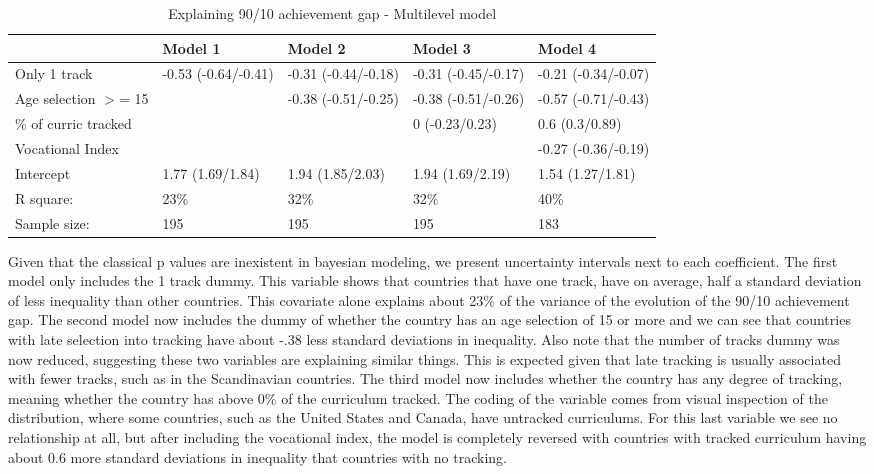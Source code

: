 \documentclass[11pt, a4paper]{article}\usepackage[]{graphicx}\usepackage[]{color}
\begin{document}
\begin{table}[ht]
\centering
\begin{tabular}{lllll}
  \hline
  & Model 1 & Model 2 & Model 3 & Model 4 \\ 
  \hline
Only 1 track & -0.53 (-0.64/-0.41) & -0.31 (-0.44/-0.18) & -0.31 (-0.45/-0.17) & -0.21 (-0.34/-0.07) \\ 
  Age selection $>$= 15 &  & -0.38 (-0.51/-0.25) & -0.38 (-0.51/-0.26) & -0.57 (-0.71/-0.43) \\ 
  \% of curric tracked &  &  & 0 (-0.23/0.23) & 0.6 (0.3/0.89) \\ 
  Vocational Index &  &  &  & -0.27 (-0.36/-0.19) \\ 
  Intercept & 1.77 (1.69/1.84) & 1.94 (1.85/2.03) & 1.94 (1.69/2.19) & 1.54 (1.27/1.81) \\ 
   \hline R square: & 23\% & 32\% & 32\% & 40\% \\ Sample size: & 195 & 195 & 195 & 183 \\ \hline \hline
\end{tabular}
\caption{Explaining 90/10 achievement gap - Multilevel model} 
\end{table}


Given that the classical p values are inexistent in bayesian modeling, we present uncertainty intervals next to each coefficient. The first model only includes the 1 track dummy. This variable shows that countries that have one track, have on average, half a standard deviation of less inequality than other countries. This covariate alone explains about 23\% of the variance of the evolution of the 90/10 achievement gap. The second model now includes the dummy of whether the country has an age selection of 15 or more and we can see that countries with late selection into tracking have about -.38 less standard deviations in inequality. Also note that the number of tracks dummy was now reduced, suggesting these two variables are explaining similar things. This is expected given that late tracking is usually associated with fewer tracks, such as in the Scandinavian countries. The third model now includes whether the country has any degree of tracking, meaning whether the country has above 0\% of the curriculum tracked. The coding of the variable comes from visual inspection of the distribution, where some countries, such as the United States and Canada, have untracked curriculums. For this last variable we see no relationship at all, but after including the vocational index, the model is completely reversed with countries with tracked curriculum having about 0.6 more standard deviations in inequality that countries with no tracking.
\end{document}
